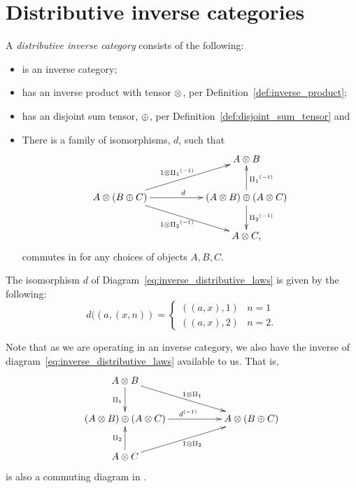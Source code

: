 \section{Distributive inverse categories} %
\label{sec:distributive_inverse_categories}
%
\begin{definition}\label{def:distributive_inverse_category}
  A \emph{distributive inverse category} \D consists of the following:
  \begin{itemize}
    \item \D is an inverse category;
    \item \D has an inverse product with tensor $\otimes$, per Definition~\ref{def:inverse_product};
    \item \D has an disjoint sum tensor, $\oplus$, per Definition~\ref{def:disjoint_sum_tensor} and
    \item There is a family of isomorphisms, $d$, such that
    \begin{equation}
      \xymatrix{
      && A\*B\\
      A \* (B \+ C) \ar[rr]^{d} \ar[urr]^{1\*\icpa} \ar[drr]_{1\*\icpb}
        && (A\*B) \+ (A \* C) \ar[u]_{\icpa} \ar[d]^{\icpb}\\
      && A\*C,
      }\label{eq:inverse_distributive_laws}
    \end{equation}
    commutes in \D for any choices of objects $A, B, C$.
  \end{itemize}
\end{definition}

\begin{example}
  The isomorphism $d$ of Diagram~\ref{eq:inverse_distributive_laws} is given by the following:
  \begin{equation}
    d((a,(x,n)) = \begin{cases}
      ((a,x),1) & n = 1\\
      ((a,x),2) & n = 2.
      \end{cases}\label{eq:pinj_distributive_isomporphism}
    \end{equation}
\end{example}
Note that as we are operating in an inverse category, we also have the inverse of
diagram~\ref{eq:inverse_distributive_laws} available to us. That is,
\begin{equation}
  \xymatrix{
  A\*B \ar[d]_{\cpa} \ar[drr]^{1\*\cpa}\\
  (A\*B) \+ (A \* C)  \ar[rr]^{\inv{d}}  &&A \* (B \+ C) \\
  A\*C\ar[u]^{\cpb} \ar[urr]_{1\*\cpb}
  }\label{eq:inverse_distributive_laws_reversed}
\end{equation}
is also a commuting diagram in \D.

